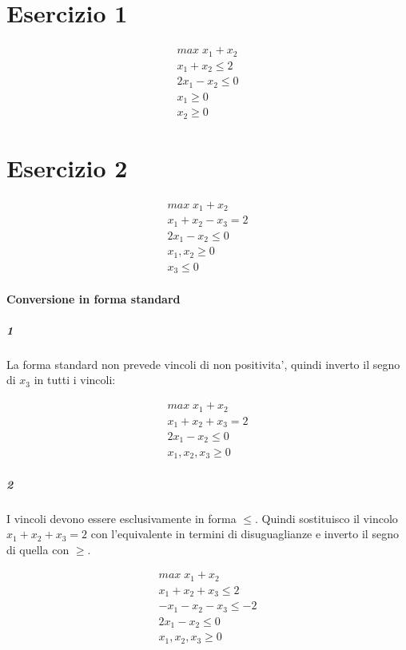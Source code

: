 \section{Esercizio 1}

\begin{align}
    \text{$max \; x_1 + x_2$} \\
    \text{$x_1 + x_2 \leq 2$} \\
    \text{$2 x_1 - x_2 \leq 0$} \\
    \text{$x_1 \geq 0$} \\
    \text{$x_2 \geq 0$}
\end{align}

\section{Esercizio 2}

\begin{align}
    \text{$max \; x_1 + x_2$} \\
    \text{$x_1 + x_2 - x_3 = 2$} \\
    \text{$2 x_1 - x_2 \leq 0$} \\
    \text{$x_1, x_2 \geq 0$} \\
    \text{$x_3 \leq 0$}
\end{align}

\paragraph{Conversione in forma standard}

\subparagraph{1}

La forma standard non prevede vincoli di non positivita', quindi inverto il segno di $x_3$ in tutti i vincoli:

\begin{align}
    \text{$max \; x_1 + x_2$} \\
    \text{$x_1 + x_2 + x_3 = 2$} \\
    \text{$2 x_1 - x_2 \leq 0$} \\
    \text{$x_1, x_2, x_3 \geq 0$}
\end{align}

\subparagraph{2}

I vincoli devono essere esclusivamente in forma $\leq$.
Quindi sostituisco il vincolo $x_1 + x_2 + x_3 = 2$ con l'equivalente in termini di disuguaglianze e inverto il segno di quella con $\geq$.

\begin{align}
    \text{$max \; x_1 + x_2$} \\
    \text{$x_1 + x_2 + x_3 \leq 2$} \\
    \text{$- x_1 - x_2 - x_3 \leq - 2$} \\
    \text{$2 x_1 - x_2 \leq 0$} \\
    \text{$x_1, x_2, x_3 \geq 0$}
\end{align}

